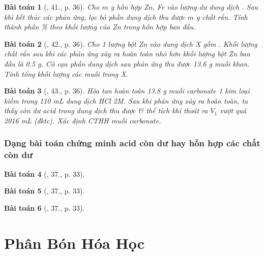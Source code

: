 \documentclass{article}
\newtheorem{baitoan}{Bài toán}
\begin{document}
\begin{baitoan}[\cite{An_350_BT_Hoa_Hoc_9}, 41., p. 36]
	Cho $m$ \emph{g} hỗn hợp \emph{Zn, Fe} vào lượng dư dung dịch \emph{}. Sau khi kết thúc các phản ứng, lọc bỏ phần dung dịch thu được $m$ \emph{g} chất rắn. Tính thành phần \% theo khối lượng của \emph{Zn} trong hỗn hợp ban đầu.
\end{baitoan}

\begin{baitoan}[\cite{An_350_BT_Hoa_Hoc_9}, 42., p. 36]
	Cho 1 lượng bột \emph{Zn} vào dung dịch X gồm \emph{}. Khối lượng chất rắn sau khi các phản ứng xảy ra hoàn toàn nhỏ hơn khối lượng bột \emph{Zn} ban đầu là \emph{0.5 g}. Cô cạn phần dung dịch sau phản ứng thu được \emph{13.6 g} muối khan. Tính tổng khối lượng các muối trong X.
\end{baitoan}

\begin{baitoan}[\cite{An_350_BT_Hoa_Hoc_9}, 43., p. 36]
	Hòa tan hoàn toàn \emph{13.8 g} muối carbonate 1 kim loại kiềm \emph{} trong \emph{110 mL} dung dịch \emph{HCl 2M}. Sau khi phản ứng xảy ra hoàn toàn, ta thấy còn dư acid trong dung dịch thu được \& thể tích khí thoát ra $V_1$ vượt quá \emph{2016 mL} (đktc). Xác định CTHH muối carbonate.
\end{baitoan}

\subsubsection{Dạng bài toán chứng minh acid còn dư hay hỗn hợp các chất còn dư}

\begin{baitoan}[\cite{An_350_BT_Hoa_Hoc_9}, 37., p. 33]
	
\end{baitoan}

\begin{baitoan}[\cite{An_350_BT_Hoa_Hoc_9}, 37., p. 33]
	
\end{baitoan}

\begin{baitoan}[\cite{An_350_BT_Hoa_Hoc_9}, 37., p. 33]
	
\end{baitoan}


\section{Phân Bón Hóa Học}
\end{document}
